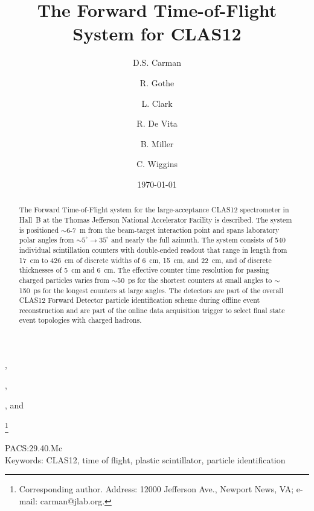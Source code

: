 \documentclass{elsart}
\begin{document}
\begin{frontmatter}

\title{The Forward Time-of-Flight System for CLAS12}

\author[JLab]{D.S. Carman},
\author[USC]{R. Gothe},
\author[Glasgow]{L. Clark}
\author[INFN]{R. De Vita}
\author[JLab]{B. Miller}, and
\author[JLab]{C. Wiggins}

\address[JLab]{Thomas Jefferson National Accelerator Facility, Newport News, VA 23606, USA}
\address[USC]{University of South Carolina, Columbia, SC 29208, USA}
\address[Glasgow]{University of Glasgow, Glasgow G12 8QQ, United Kingdom}
\address[INFN]{INFN, Sezione di Genova, 16146 Genova, Italy}
\thanks[corresponding]{Corresponding author. Address: 12000 Jefferson Ave., Newport News, VA; 
e-mail: carman@jlab.org.}

\date{\today}


\begin{abstract}
The Forward Time-of-Flight system for the large-acceptance CLAS12 spectrometer in Hall~B at the
Thomas Jefferson National Accelerator Facility is described. The system is positioned $\sim$6-7~m
from the beam-target interaction point and spans laboratory polar angles from $\sim 5^\circ \to 35^\circ$
and nearly the full azimuth. The system consists of 540 individual scintillation counters with double-ended
readout that range in length from 17~cm to 426~cm of discrete widths of 6~cm, 15~cm, and 22~cm, and of
discrete thicknesses of 5~cm and 6~cm. The effective counter time resolution for passing charged particles
varies from $\sim$50~ps for the shortest counters at small angles to $\sim$150~ps for the longest counters
at large angles. The detectors are part of the overall CLAS12 Forward Detector particle identification scheme
during offline event reconstruction and are part of the online data acquisition trigger to select final state
event topologies with charged hadrons.
\end{abstract}

\end{frontmatter}

PACS:29.40.Mc \\
Keywords: CLAS12, time of flight, plastic scintillator, particle identification
\newpage

\newpage
\tableofcontents
\end{document}
